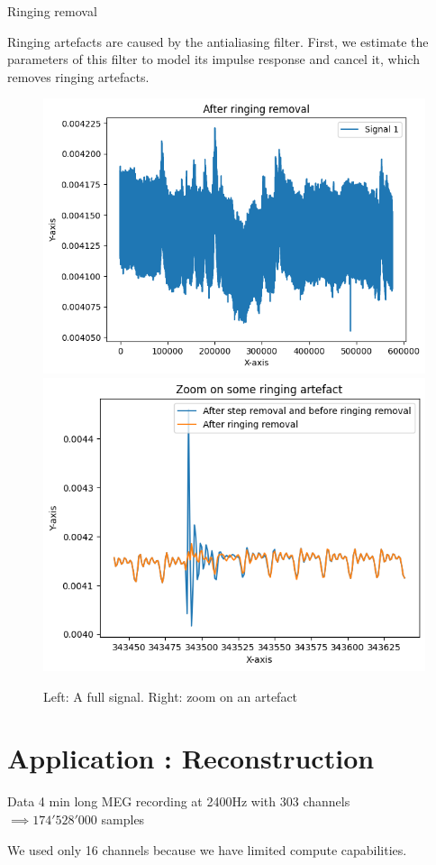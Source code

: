 \documentclass[10pt,serif]{beamer}
\begin{document}
\begin{frame}{Ringing removal}

    Ringing artefacts are caused by the antialiasing filter. First, we estimate the parameters of this filter to model its impulse response and cancel it, which removes ringing artefacts.
    \begin{figure}
        \centering
        \includegraphics[width=.4\textwidth]{figures/ringing_removal_real.png}
        \includegraphics[width=.4\textwidth]{figures/ringin_removal_zoom.png}
        \caption{Left: A full signal. Right: zoom on an artefact}
        \label{fig:data}
    \end{figure}
\end{frame}


\section[\color{white} Application]{Application : Reconstruction}\label{sec:results}

\begin{frame}{Data}
  4 min long MEG recording at 2400Hz with 303 channels\\$\implies 174'528'000$ samples

  We used only 16 channels because we have limited compute capabilities.
\end{frame}
\end{document}
